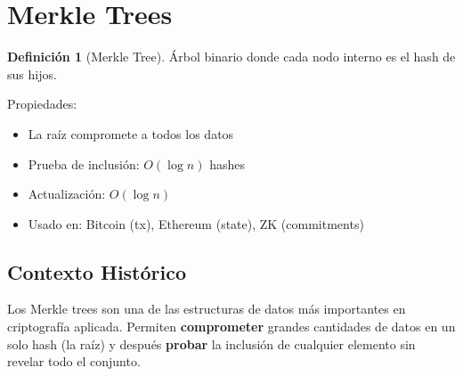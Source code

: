 \documentclass[11pt,a4paper,twoside,openright]{book}
\theoremstyle{definition}
\newtheorem{definition}{Definición}[chapter]
\theoremstyle{plain}
\theoremstyle{remark}
\begin{document}

\section{Merkle Trees}

\begin{definition}[Merkle Tree]
Árbol binario donde cada nodo interno es el hash de sus hijos.
\end{definition}

Propiedades:
\begin{itemize}
    \item La raíz compromete a todos los datos
    \item Prueba de inclusión: $O(\log n)$ hashes
    \item Actualización: $O(\log n)$
    \item Usado en: Bitcoin (tx), Ethereum (state), ZK (commitments)
\end{itemize}

\subsection{Contexto Histórico}

\begin{intuicion}
Los Merkle trees son una de las estructuras de datos más importantes en criptografía aplicada. Permiten \textbf{comprometer} grandes cantidades de datos en un solo hash (la raíz) y después \textbf{probar} la inclusión de cualquier elemento sin revelar todo el conjunto.
\end{intuicion}
\end{document}
